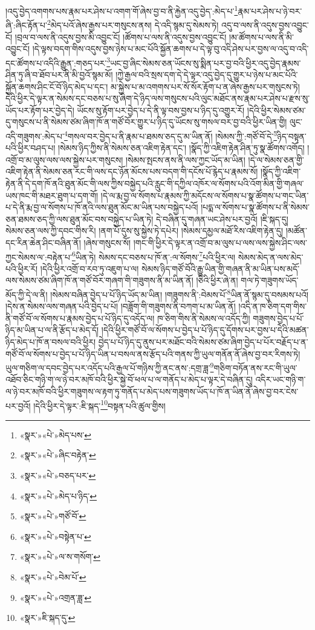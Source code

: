 །འདུ་བྱེད་འགགས་པས་རྣམ་པར་ཤེས་པ་འགག་གོ་ཞེས་བྱ་བ་ནི་རྐྱེན་འདུ་བྱེད་:མེད་པ་\footnote{«སྣར་»«པེ་»མེད་པས་}རྣམ་པར་ཤེས་པ་ཉེ་བར་ཞི་:ཞིང་རྟོན་པ་\footnote{«སྣར་»«པེ་»ཞིང་བརྟེན་}མེད་པའོ་ཞེས་རྒྱས་པར་གསུངས་ནས། དེ་འདི་སྙམ་དུ་སེམས་ཏེ། འདུ་བ་ལས་ནི་འདུས་བྱས་འབྱུང་ངོ། །བྲལ་བ་ལས་ནི་འདུས་བྱས་མི་འབྱུང་ངོ། །ཚོགས་པ་ལས་ནི་འདུས་བྱས་འབྱུང་ངོ། །མ་ཚོགས་པ་ལས་ནི་མི་འབྱུང་ངོ། །དེ་ལྟས་བདག་གིས་འདུས་བྱས་ཉེས་པ་མང་པོའི་སྐྱོན་ཆགས་པ་དེ་ལྟ་བུ་འདི་ཤེས་པར་བྱས་ལ་འདུ་བ་འདི་དང་ཚོགས་པ་འདིའི་རྒྱུན་:གཅད་པར་\footnote{«སྣར་»«པེ་»བཅད་པར་}ཡང་བྱ་ཞིང་སེམས་ཅན་ཡོངས་སུ་སྨིན་པར་བྱ་བའི་ཕྱིར་འདུ་བྱེད་རྣམས་ཤིན་ཏུ་ཞི་བ་ཐོབ་པར་ནི་མི་བྱའོ་སྙམ་མོ། །ཀྱེ་རྒྱལ་བའི་སྲས་དག་དེ་དེ་ལྟར་འདུ་བྱེད་དུ་གྱུར་པ་ཉེས་པ་མང་པོའི་སྐྱོན་ཆགས་ཤིང་ངོ་བོ་ཉིད་མེད་པ་དང་། མ་སྐྱེས་པ་མ་འགགས་པར་སོ་སོར་རྟོག་པ་ན་ཞེས་རྒྱས་པར་གསུངས་ཏེ། དེའི་ཕྱིར་དེ་ལྟར་ན་སེམས་དང་བཅས་པ་སུ་ཞིག་དེ་ཉིད་ལས་གསུངས་པའི་ལུང་མཐོང་ནས་རྣམ་པར་ཤེས་པ་རྫས་སུ་ཡོད་པར་རྟོག་པར་བྱེད་དེ། ཡོངས་སུ་རྟོག་པར་བྱེད་པ་དེ་ནི་ལྟ་བས་བྱས་པ་ཉིད་དུ་འགྱུར་རོ། །དེའི་ཕྱིར་སེམས་ཙམ་དུ་གསུངས་པ་ནི་སེམས་ཙམ་ཞིག་ཁོ་ན་གཙོ་བོར་གྱུར་པ་ཉིད་དུ་ཡོངས་སུ་གསལ་བར་བྱ་བའི་ཕྱིར་ཡིན་གྱི། ལུང་འདི་གཟུགས་:མེད་པ་\footnote{«སྣར་»«པེ་»མེད་པ་ཉིད་}གསལ་བར་བྱེད་པ་ནི་རྣམ་པ་ཐམས་ཅད་དུ་མ་ཡིན་ནོ། །སེམས་ཀྱི་:གཙོ་བོ་དེ་\footnote{«སྣར་»«པེ་»གཙོ་བོ་}ཉིད་བསྟན་པའི་ཕྱིར་བཤད་པ། །སེམས་ཉིད་ཀྱིས་ནི་སེམས་ཅན་འཇིག་རྟེན་དང་། །སྣོད་ཀྱི་འཇིག་རྟེན་ཤིན་ཏུ་སྣ་ཚོགས་འགོད། །འགྲོ་བ་མ་ལུས་ལས་ལས་སྐྱེས་པར་གསུངས། །སེམས་སྤངས་ནས་ནི་ལས་ཀྱང་ཡོད་མ་ཡིན། །དེ་ལ་སེམས་ཅན་གྱི་འཇིག་རྟེན་ནི་སེམས་ཅན་རང་གི་ལས་དང་ཉོན་མོངས་པས་བདག་གི་དངོས་པོ་རྙེད་པ་རྣམས་སོ། །སྣོད་ཀྱི་འཇིག་རྟེན་ནི་དེ་དག་ཁོ་ནའི་ཐུན་མོང་གི་ལས་ཀྱིས་བསྐྱེད་པའི་རླུང་གི་དཀྱིལ་འཁོར་ལ་སོགས་པའི་འོག་མིན་གྱི་གཞལ་ཡས་ཁང་གི་མཐར་ཐུག་པ་དག་གོ། །དེ་ལ་རྨ་བྱ་ལ་སོགས་པ་རྣམས་ཀྱི་མདོངས་ལ་སོགས་པ་སྣ་ཚོགས་པ་གང་ཡིན་པ་དེ་ནི་རྨ་བྱ་ལ་སོགས་པ་ཁོ་ནའི་ལས་ཐུན་མོང་མ་ཡིན་པས་བསྐྱེད་པའོ། །པདྨ་ལ་སོགས་པ་སྣ་ཚོགས་པ་ནི་སེམས་ཅན་ཐམས་ཅད་ཀྱི་ལས་ཐུན་མོང་བས་བསྐྱེད་པ་ཡིན་ཏེ། དེ་བཞིན་དུ་གཞན་ཡང་ཤེས་པར་བྱའོ། །ཇི་སྐད་དུ། སེམས་ཅན་ལས་ཀྱི་དབང་གིས་རི། །ནག་པོ་དུས་སུ་སྐྱེས་ཏེ་དཔེར། །སེམས་དམྱལ་མཐོ་རིས་འཇིག་རྟེན་དུ། །མཚོན་དང་རིན་ཆེན་ཤིང་བཞིན་ནོ། །ཞེས་གསུངས་སོ། །གང་གི་ཕྱིར་དེ་ལྟར་ན་འགྲོ་བ་མ་ལུས་པ་ལས་ལས་སྐྱེས་ཤིང་ལས་ཀྱང་སེམས་ལ་:བརྟེན་པ་\footnote{«སྣར་»«པེ་»བསྟེན་པ་}ཡིན་ཏེ། སེམས་དང་བཅས་པ་ཁོ་ན་:ལ་སོགས་\footnote{«སྣར་»«པེ་»ལ་ས་གསོག་}པའི་ཕྱིར་ལ། སེམས་མེད་ན་ལས་མེད་པའི་ཕྱིར་རོ། །དེའི་ཕྱིར་འགྲོ་བ་རབ་ཏུ་འཇུག་པ་ལ། སེམས་ཉིད་གཙོ་བོའི་རྒྱུ་ཡིན་གྱི་གཞན་ནི་མ་ཡིན་པས་མདོ་ལས་སེམས་ཙམ་ཞིག་ཁོ་ན་གཙོ་བོར་གཞག་གི་གཟུགས་ནི་མ་ཡིན་ནོ། །ཅིའི་ཕྱིར་ཞེ་ན། གལ་ཏེ་གཟུགས་ཡོད་མོད་ཀྱི་དེ་ལ་ནི། །སེམས་བཞིན་བྱེད་པ་པོ་ཉིད་ཡོད་མ་ཡིན། །གཟུགས་ནི་:བེམས་པོ་\footnote{«སྣར་»«པེ་»བེམ་པོ་}ཡིན་ནོ་སྙམ་དུ་བསམས་པའོ། །དེས་ན་སེམས་ལས་གཞན་པའི་བྱེད་པ་པོ། །བཟློག་གི་གཟུགས་ནི་བཀག་པ་མ་ཡིན་ནོ། །འདི་ན་ཁ་ཅིག་དག་གིས་ནི་གཙོ་བོ་ལ་སོགས་པ་རྣམས་བྱེད་པ་པོ་ཉིད་དུ་འདོད་ལ། ཁ་ཅིག་གིས་ནི་སེམས་ལ་འདོད་ཀྱི། གཟུགས་བྱེད་པ་པོ་ཉིད་མ་ཡིན་པ་ལ་ནི་རྩོད་པ་མེད་དོ། །དེའི་ཕྱིར་གཙོ་བོ་ལ་སོགས་པ་བྱེད་པ་པོ་ཉིད་དུ་དོགས་པར་བྱས་པ་དེའི་མཚན་ཉིད་མེད་པ་ཁོ་ན་བསལ་བའི་ཕྱིར། བྱེད་པ་པོ་ཉིད་དུ་ནུས་པར་མཐོང་བའི་སེམས་ཙམ་ཞིག་བྱེད་པ་པོར་བརྗོད་པ་ན་གཙོ་བོ་ལ་སོགས་པ་བྱེད་པ་པོ་ཉིད་ཡིན་པ་བསལ་ནས་རྩོད་པའི་གནས་ཀྱི་ཡུལ་གནོན་ནོ་ཞེས་བྱ་བར་རིགས་ཏེ། ཡུལ་གཅིག་ལ་དབང་བྱེད་པར་འདོད་པའི་རྒྱལ་པོ་གཉིས་ཀྱི་ནང་ནས་:དགྲ་ཟླ་\footnote{«སྣར་»«པེ་»འགྲན་ཟླ་}གཅིག་བཏོན་ནས་རང་གི་ཡུལ་འཐོབ་ཅིང་གཉི་ག་ལ་ཉེ་བར་མཁོ་བའི་ཕྱིར་སྐྱེ་བོ་ཕལ་པ་ལ་གནོད་པ་མེད་པ་ལྟར་དེ་བཞིན་དུ། འདིར་ཡང་གཉི་ག་ལ་ཉེ་བར་མཁོ་བའི་ཕྱིར་གཟུགས་ལ་རྟག་ཏུ་གནོད་པ་མེད་པས་གཟུགས་ཡོད་པ་ཁོ་ན་ཡིན་ནོ་ཞེས་བྱ་བར་ངེས་པར་བྱའོ། །དེའི་ཕྱིར་དེ་ལྟར་:ཇི་སྐད་\footnote{«སྣར་»ཇི་སྐད་དུ་}བསྟན་པའི་ཚུལ་གྱིས། 